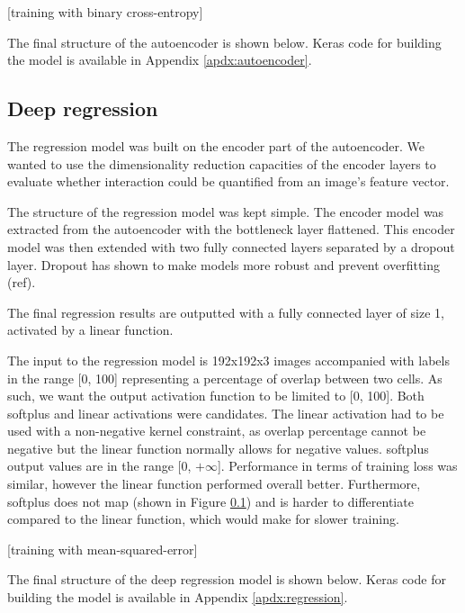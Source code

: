 [training with binary cross-entropy]

The final structure of the autoencoder is shown below. Keras code for building the model is available in Appendix \ref{apdx:autoencoder}.

\subsection{Deep regression}

The regression model was built on the encoder part of the autoencoder. We wanted to use the dimensionality reduction capacities of the encoder layers to evaluate whether interaction could be quantified from an image's feature vector.

The structure of the regression model was kept simple. The encoder model was extracted from the autoencoder with the bottleneck layer flattened. This encoder model was then extended with two fully connected layers separated by a dropout layer. Dropout has shown to make models more robust and prevent overfitting (ref).

The final regression results are outputted with a fully connected layer of size 1, activated by a linear function.

The input to the regression model is 192x192x3 images accompanied with labels in the range [0, 100] representing a percentage of overlap between two cells. As such, we want the output activation function to be limited to [0, 100]. Both softplus and linear activations were candidates. The linear activation had to be used with a non-negative kernel constraint, as overlap percentage cannot be negative but the linear function normally allows for negative values. softplus output values are in the range [0, $+\infty$]. Performance in terms of training loss was similar, however the linear function performed overall better. Furthermore, softplus does not map (shown in Figure \ref{}) and is harder to differentiate compared to the linear function, which would make for slower training.

[training with mean-squared-error]

The final structure of the deep regression model is shown below. Keras code for building the model is available in Appendix \ref{apdx:regression}. 
